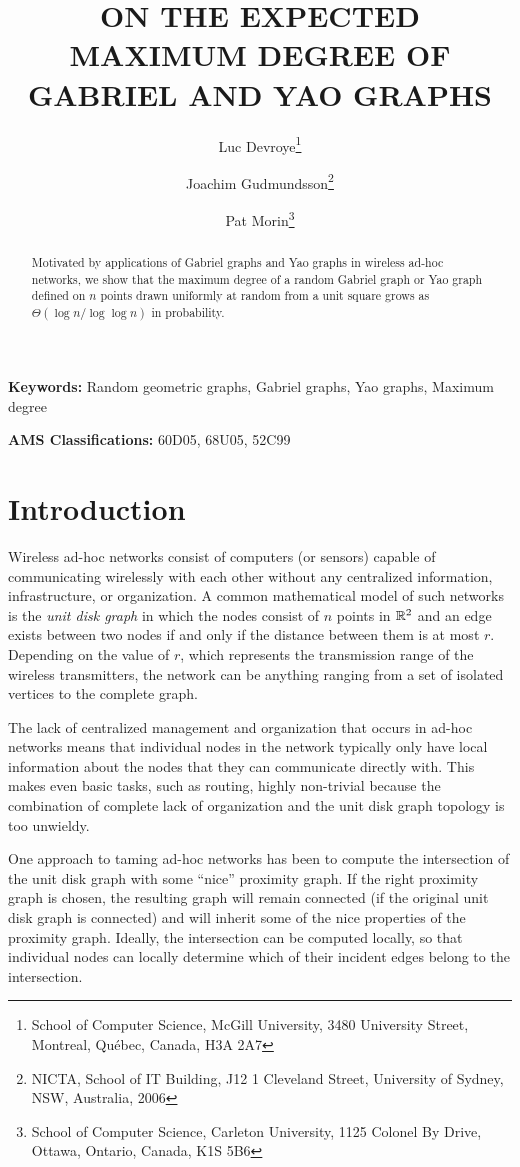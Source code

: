 \documentclass[lotsofwhite,charterfonts]{patmorin}
\title{\MakeUppercase{On the Expected Maximum Degree 
	of Gabriel and Yao Graphs}}
\author{Luc Devroye\thanks{School of Computer Science, McGill University,
3480 University Street,
Montreal, Qu\'ebec, Canada, H3A 2A7}
	\and Joachim Gudmundsson\thanks{NICTA, School of IT Building, J12 1
Cleveland Street, University of Sydney, NSW, Australia, 2006}
	\and Pat Morin\thanks{School of Computer Science, Carleton
University, 1125 Colonel By Drive, Ottawa, Ontario, Canada, K1S 5B6}}
\begin{document}
\maketitle
\begin{abstract}
Motivated by applications of Gabriel graphs and Yao graphs in wireless
ad-hoc networks, we show that the maximum degree of a random Gabriel
graph or Yao graph defined on $n$ points drawn uniformly at random from
a unit square  grows as $\Theta ( \log n / \log \log n)$ in probability.
\end{abstract}

\noindent\textbf{Keywords:}
Random geometric graphs, Gabriel graphs, Yao graphs, Maximum degree

\noindent\textbf{AMS Classifications:} 60D05, 68U05, 52C99


\section{Introduction}

Wireless ad-hoc networks consist of computers (or sensors) capable of
communicating wirelessly with each other without any centralized
information, infrastructure, or organization.  A common mathematical model
of such networks is the \emph{unit disk graph} in which the nodes consist
of $n$ points in $\mathbb{R}^2$ and an edge exists between two nodes if and only if
the distance between them is at most $r$.  Depending on the value of $r$,
which represents the transmission range of the wireless transmitters, the
network can be anything ranging from a set of isolated vertices to the
complete graph.

The lack of centralized management and organization that occurs in ad-hoc
networks means that individual nodes in the network typically only have
local information about the nodes that they can communicate directly with.
This makes even basic tasks, such as routing, highly non-trivial because
the combination of complete lack of organization and the unit disk graph
topology is too unwieldy.

One approach to taming ad-hoc networks has been to compute the
intersection of the unit disk graph with some ``nice'' proximity graph.
If the right proximity graph is chosen, the resulting graph will
remain connected (if the original unit disk graph is connected) and will
inherit some of the nice properties of the proximity graph.   Ideally, the
intersection can be computed locally, so that individual nodes can locally
determine which of their incident edges belong to the intersection.
\end{document}
